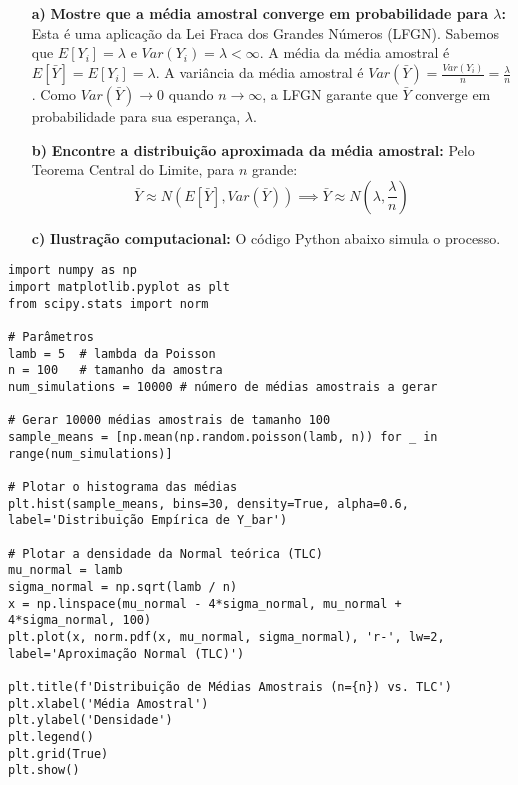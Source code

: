 \documentclass[12pt, a4paper]{article}
\begin{document}
\begin{itemize}
    \item[\textbf{a)}] \textbf{Mostre que a média amostral converge em probabilidade para $\lambda$:}
    Esta é uma aplicação da Lei Fraca dos Grandes Números (LFGN).
    Sabemos que $E[Y_i] = \lambda$ e $Var(Y_i) = \lambda < \infty$.
    A média da média amostral é $E[\bar{Y}] = E[Y_i] = \lambda$.
    A variância da média amostral é $Var(\bar{Y}) = \frac{Var(Y_i)}{n} = \frac{\lambda}{n}$.
    Como $Var(\bar{Y}) \to 0$ quando $n \to \infty$, a LFGN garante que $\bar{Y}$ converge em probabilidade para sua esperança, $\lambda$.

    \item[\textbf{b)}] \textbf{Encontre a distribuição aproximada da média amostral:}
    Pelo Teorema Central do Limite, para $n$ grande:
    $$ \bar{Y} \approx N\left(E[\bar{Y}], Var(\bar{Y})\right) \implies \bar{Y} \approx N\left(\lambda, \frac{\lambda}{n}\right) $$
    
    \item[\textbf{c)}] \textbf{Ilustração computacional:} O código Python abaixo simula o processo.
\end{itemize}
\begin{verbatim}
import numpy as np
import matplotlib.pyplot as plt
from scipy.stats import norm

# Parâmetros
lamb = 5  # lambda da Poisson
n = 100   # tamanho da amostra
num_simulations = 10000 # número de médias amostrais a gerar

# Gerar 10000 médias amostrais de tamanho 100
sample_means = [np.mean(np.random.poisson(lamb, n)) for _ in range(num_simulations)]

# Plotar o histograma das médias
plt.hist(sample_means, bins=30, density=True, alpha=0.6, label='Distribuição Empírica de Y_bar')

# Plotar a densidade da Normal teórica (TLC)
mu_normal = lamb
sigma_normal = np.sqrt(lamb / n)
x = np.linspace(mu_normal - 4*sigma_normal, mu_normal + 4*sigma_normal, 100)
plt.plot(x, norm.pdf(x, mu_normal, sigma_normal), 'r-', lw=2, label='Aproximação Normal (TLC)')

plt.title(f'Distribuição de Médias Amostrais (n={n}) vs. TLC')
plt.xlabel('Média Amostral')
plt.ylabel('Densidade')
plt.legend()
plt.grid(True)
plt.show()
\end{verbatim}
\end{document}
